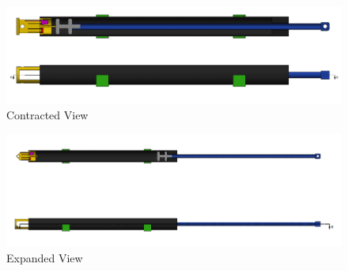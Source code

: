 \documentclass[10pt,conference,compsocconf]{IEEEtran}
\begin{document}
\begin{figure}
  \centering
  \includegraphics[width=\textwidth]{figures/Contracted.png}
  \caption{Contracted View}  
\end{figure}

\begin{figure}
  \centering
  \includegraphics[width=\textwidth]{figures/Expanded.png}
  \caption{Expanded View}  
\end{figure}




%
%

\end{document}
